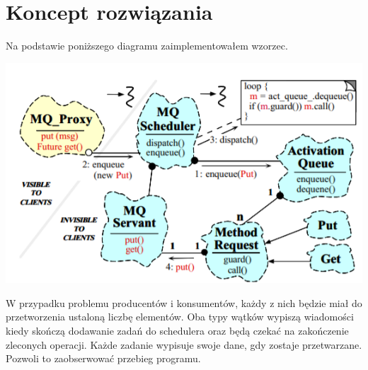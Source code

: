 \documentclass[12pt]{article}
\begin{document}
\section{Koncept rozwiązania}
Na podstawie poniższego diagramu zaimplementowałem wzorzec.
\begin{center}
\centering
    \includegraphics{active_object.png}
\end{center}
W przypadku problemu producentów i konsumentów, każdy z nich będzie miał do przetworzenia ustaloną liczbę elementów. Oba typy wątków wypiszą wiadomości kiedy skończą dodawanie zadań do schedulera oraz będą czekać na zakończenie zleconych operacji. Każde zadanie wypisuje swoje dane, gdy zostaje przetwarzane. Pozwoli to zaobserwować przebieg programu.
\end{document}
